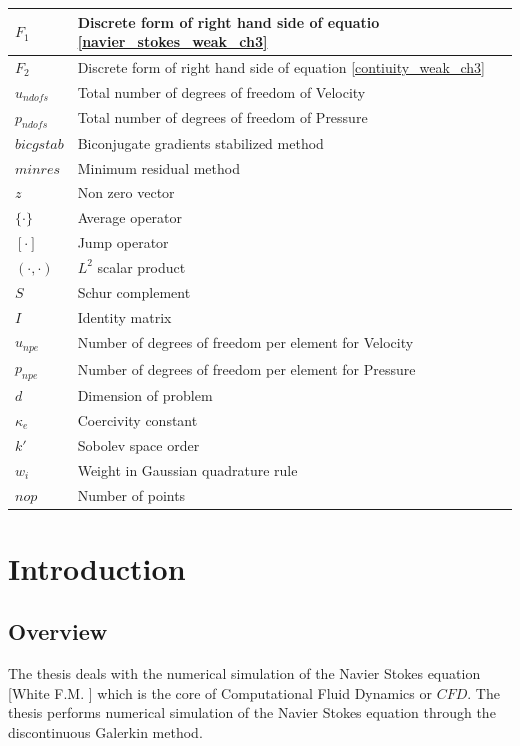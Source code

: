 \documentclass[a4paper]{book}
\begin{document}
\begin{longtable}{| p{} | p{} |}
\hline
$F_1$ & Discrete form of right hand side of equatio \eqref{navier_stokes_weak_ch3}\\
\hline
$F_2$ & Discrete form of right hand side of equation \eqref{contiuity_weak_ch3}\\
\hline
$u_{ndofs}$ & Total number of degrees of freedom of Velocity\\
\hline
$p_{ndofs}$ & Total number of degrees of freedom of Pressure\\
\hline
$bicgstab$ & Biconjugate gradients stabilized method\\
\hline
$minres$ & Minimum residual method\\
\hline
$z$ & Non zero vector\\
\hline
$\lbrace \cdot \rbrace$ & Average operator\\
\hline
$[\cdot]$ & Jump operator\\
\hline
$(\cdot,\cdot)$ & $L^2$ scalar product\\
\hline
$S$ & Schur complement\\
\hline
$I$ & Identity matrix\\
\hline
$u_{npe}$ & Number of degrees of freedom per element for Velocity\\
\hline
$p_{npe}$ & Number of degrees of freedom per element for Pressure\\
\hline
$d$ & Dimension of problem\\
\hline
$\kappa_e$ & Coercivity constant\\
\hline
$k'$ & Sobolev space order\\
\hline
$w_i$ & Weight in Gaussian quadrature rule\\
\hline
$nop$ & Number of points\\
\hline
\end{longtable}
\listoffigures
\listoftables

\tableofcontents

\chapter{Introduction}

\section{Overview}

The thesis deals with the numerical simulation of the Navier Stokes equation [White F.M. \cite{white}] which is the core of Computational Fluid Dynamics or $CFD$. The thesis performs numerical simulation of the Navier Stokes equation through the discontinuous Galerkin method.
\end{document}
